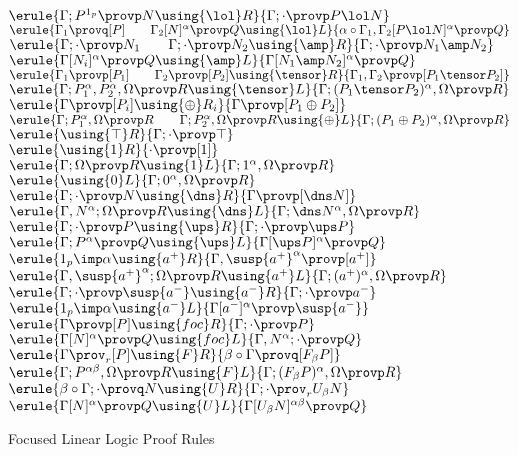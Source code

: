 \begin{figure}
\begin{center}
\footnotesize
{}
$
\erule
{\Gamma; P^{1_p} \provp  N \using {\lol}R}
{\Gamma; \cdot \provp P \lol N}
$
\gap
$
\erule
{\Gamma_1 \provq [P] \qquad \Gamma_2[N]^\alpha \provp Q \using {\lol}L}
{\alpha \circ \Gamma_1,\Gamma_2 [P \lol N]^\alpha \provp Q}
$
\gap
$
\erule
{\Gamma;\cdot\provp N_1  \qquad \Gamma;\cdot\provp N_2 \using {\amp}R}
{\Gamma;\cdot\provp N_1\amp N_2 }
$
\gap
$
\erule
{\Gamma [N_i]^\alpha \provp Q \using {\amp}L}
{\Gamma [N_1 \amp N_2]^\alpha \provp Q}
$
\gap
$
\erule
{\Gamma_1 \provp [P_1] \qquad \Gamma_2 \provp [P_2]\using {\tensor}R}
{\Gamma_1, \Gamma_2  \provp [P_1 \tensor P_2]}
$
\gap
$
\erule
{\Gamma; P_1^\alpha, P_2^\alpha, \Omega \provp R \using {\tensor}L}
{\Gamma; (P_1\tensor P_2)^\alpha, \Omega  \provp  R}
$
\gap
$
\erule
{\Gamma \provp [P_i] \using {\oplus}R_i}
{\Gamma  \provp [P_1 \oplus P_2]}
$
\gap
$
\erule
{\Gamma; P_1^\alpha, \Omega \provp R \qquad \Gamma; P_2^\alpha, \Omega \provp R\using {\oplus}L}
{\Gamma; (P_1\oplus P_2)^\alpha, \Omega \provp R}
$
\gap
$
\erule
{\using {\top}R}
{\Gamma;\cdot  \provp \top}
$
\gap
$
\erule
{\using {1}R}
{\cdot  \provp [1]}
$
\gap
$
\erule
{\Gamma; \Omega \provp R \using {1}L}
{\Gamma; 1^\alpha, \Omega \provp R}
$
\gap
$
\erule
{\using {0}L}
{\Gamma; 0^\alpha, \Omega \provp R}
$
\gap
$
\erule
{\Gamma;\cdot \provp N\using {\dns}R}
{\Gamma  \provp [\dns N]}
$
\gap
$
\erule
{\Gamma, N^\alpha; \Omega \provp R \using {\dns}L}
{\Gamma; \dns N^\alpha,  \Omega \provp R}
$
\gap
$
\erule
{\Gamma; \cdot \provp P\using {\ups}R}
{\Gamma; \cdot  \provp \ups P}
$
\gap
$
\erule
{\Gamma; P^\alpha\provp Q \using {\ups}L}
{\Gamma[\ups P]^\alpha \provp Q}
$
\gap
$
\erule
{1_p \imp \alpha \using {a^+}R}
{\Gamma, \susp{a^+}^\alpha  \provp [a^+ ]}
$
\gap
$
\erule
{\Gamma, \susp{a^+}^\alpha; \Omega\provp R \using {a^+}L}
{\Gamma;  (a^+)^\alpha, \Omega  \provp R}
$
\gap
$
\erule
{\Gamma; \cdot \provp \susp{a^-}\using {a^-}R}
{\Gamma; \cdot  \provp a^-}
$
\gap
$
\erule
{1_p \imp \alpha \using {a^-}L }
{\Gamma[a^-]^\alpha \provp \susp{a^-}}
$
\break
$
\erule
{\Gamma \provp [P]\using {foc}R}
{\Gamma;\cdot  \provp P}
$
\gap
$
\erule
{\Gamma[N]^\alpha \provp Q\using {foc}L}
{\Gamma,N^\alpha;\cdot  \provp Q}
$
\break
$
\erule
{\Gamma \prov_r [P]\using {F}R}
{\beta \circ \Gamma  \provq [F_\beta P]}
$
\gap
$
\erule
{\Gamma; P^{\alpha\beta}, \Omega  \provp R\using {F}L}
{\Gamma;(F_\beta P)^\alpha, \Omega  \provp R}
$
\break
$
\erule
{ \beta \circ \Gamma;\cdot\provq N \using {U}R}
{\Gamma;\cdot\prov_r U_\beta N }
$
\gap
$
\erule
{\Gamma [N]^\alpha \provp Q \using {U}L}
{\Gamma [U_\beta N]^{\alpha\beta} \provp Q}
$
\end{center}
\caption{Focused Linear Logic Proof Rules \label{foc-rules}}
\end{figure}
